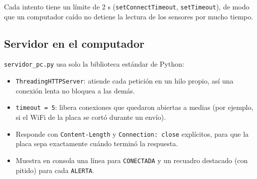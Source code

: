 \documentclass[11pt,a4paper]{article}
\begin{document}
\begin{center}
\end{center}

Cada intento tiene un límite de 2 s (\texttt{setConnectTimeout}, \texttt{setTimeout}),
de modo que un computador caído no detiene la lectura de los sensores por mucho tiempo.

\subsection{Servidor en el computador}

\texttt{servidor\_pc.py} usa solo la biblioteca estándar de Python:
\begin{itemize}[leftmargin=*]
  \item \texttt{ThreadingHTTPServer}: atiende cada petición en un hilo propio, así una
        conexión lenta no bloquea a las demás.
  \item \texttt{timeout = 5}: libera conexiones que quedaron abiertas a medias (por
        ejemplo, si el WiFi de la placa se cortó durante un envío).
  \item Responde con \texttt{Content-Length} y \texttt{Connection: close} explícitos,
        para que la placa sepa exactamente cuándo terminó la respuesta.
  \item Muestra en consola una línea para \texttt{CONECTADA} y un recuadro destacado
        (con pitido) para cada \texttt{ALERTA}.
\end{itemize}
\end{document}
